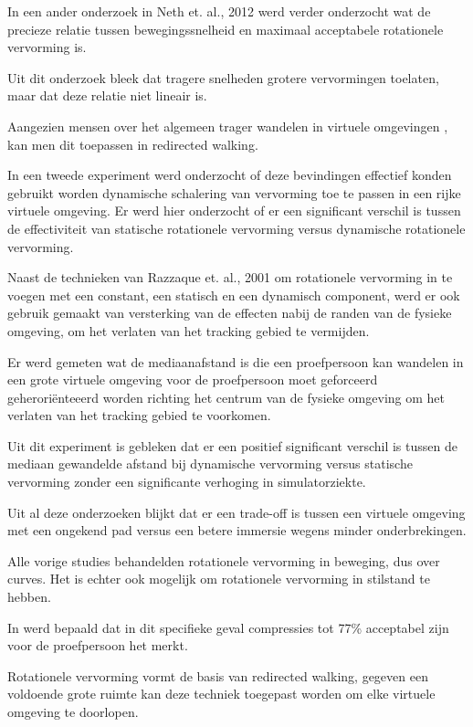 In een ander onderzoek in Neth et. al., 2012 \cite{neth12} werd verder 
onderzocht wat de precieze relatie tussen bewegingssnelheid en maximaal 
acceptabele rotationele vervorming is.

Uit dit onderzoek bleek dat tragere snelheden grotere vervormingen toelaten, maar
dat deze relatie niet lineair is.

Aangezien mensen over het algemeen trager wandelen in virtuele omgevingen
\cite{mohler07}, kan men dit toepassen in redirected walking.

In een tweede experiment \cite{neth12} werd onderzocht of deze bevindingen
effectief konden gebruikt worden dynamische schalering van vervorming toe te
passen in een rijke virtuele omgeving. Er werd hier onderzocht of er een
significant verschil is tussen de effectiviteit van statische rotationele
vervorming versus dynamische rotationele vervorming.

Naast de technieken van Razzaque et. al., 2001 \cite{kohn01} om rotationele
vervorming in te voegen met een constant, een statisch en een dynamisch 
component, werd er ook gebruik gemaakt van versterking van de effecten nabij de 
randen van de fysieke omgeving, om het verlaten van het tracking gebied te 
vermijden.

Er werd gemeten wat de mediaanafstand is die een proefpersoon kan wandelen in 
een grote virtuele omgeving voor de proefpersoon moet geforceerd 
geherori\"enteeerd worden richting het centrum van de fysieke omgeving om het 
verlaten van het tracking gebied te voorkomen.

Uit dit experiment is gebleken dat er een positief significant verschil is tussen
de mediaan gewandelde afstand bij dynamische vervorming versus statische
vervorming zonder een significante verhoging in simulatorziekte.

Uit al deze onderzoeken blijkt dat er een trade-off is tussen een virtuele 
omgeving met een ongekend pad\cite{neth12} versus een betere immersie wegens 
minder onderbrekingen\cite{engel08,kohn01}. 

Alle vorige studies behandelden rotationele vervorming in beweging, dus over 
curves. Het is echter ook mogelijk om rotationele vervorming in stilstand te
hebben.

In \cite{steinicke09} werd bepaald dat in dit specifieke geval compressies tot
77\% acceptabel zijn voor de proefpersoon het merkt.

Rotationele vervorming vormt de basis van redirected walking, gegeven een
voldoende grote ruimte kan deze techniek toegepast worden om elke virtuele
omgeving te doorlopen.


